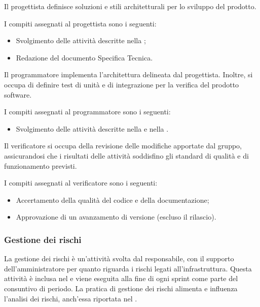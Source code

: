 \par Il progettista definisce soluzioni e stili architetturali per lo sviluppo del prodotto.
\par I compiti assegnati al progettista sono i seguenti:
\begin{itemize}
  \item Svolgimento delle attività descritte nella ;
  \item Redazione del documento Specifica Tecnica.
\end{itemize}

\par Il programmatore implementa l'architettura delineata dal progettista. Inoltre, si occupa di definire test di unità e di integrazione per la verifica del prodotto software.
\par I compiti assegnati al programmatore sono i seguenti:
\begin{itemize}
  \item Svolgimento delle attività descritte nella  e nella .
\end{itemize}

\par Il verificatore si occupa della revisione delle modifiche apportate dal gruppo, assicurandosi che i risultati delle attività soddisfino gli standard di qualità e di funzionamento previsti.
\par I compiti assegnati al verificatore sono i seguenti:
\begin{itemize}
  \item Accertamento della qualità del codice e della documentazione;
  \item Approvazione di un avanzamento di versione (escluso il rilascio).
\end{itemize}

\subsubsection{Gestione dei rischi}
\par La gestione dei rischi è un’attività svolta dal responsabile, con il supporto dell’amministratore per quanto riguarda i rischi legati all’infrastruttura. Questa attività è inclusa nel \PianoDiProgetto e viene eseguita alla fine di ogni sprint come parte del consuntivo di periodo. La pratica di gestione dei rischi alimenta e influenza l’analisi dei rischi, anch’essa riportata nel \PianoDiProgetto.

